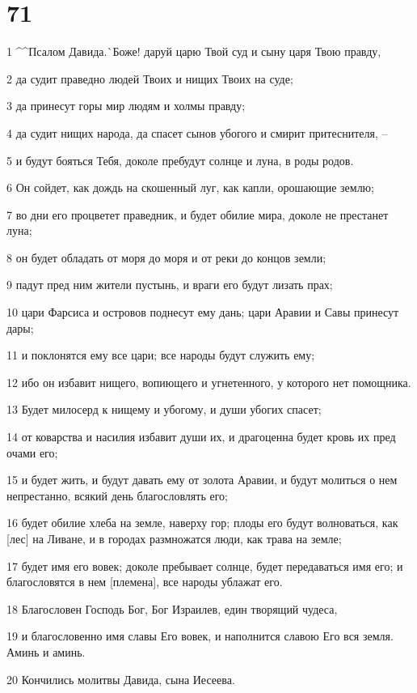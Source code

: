 \chapter{71}

\par 1 ^^Псалом Давида.^^ Боже! даруй царю Твой суд и сыну царя Твою правду,
\par 2 да судит праведно людей Твоих и нищих Твоих на суде;
\par 3 да принесут горы мир людям и холмы правду;
\par 4 да судит нищих народа, да спасет сынов убогого и смирит притеснителя, --
\par 5 и будут бояться Тебя, доколе пребудут солнце и луна, в роды родов.
\par 6 Он сойдет, как дождь на скошенный луг, как капли, орошающие землю;
\par 7 во дни его процветет праведник, и будет обилие мира, доколе не престанет луна;
\par 8 он будет обладать от моря до моря и от реки до концов земли;
\par 9 падут пред ним жители пустынь, и враги его будут лизать прах;
\par 10 цари Фарсиса и островов поднесут ему дань; цари Аравии и Савы принесут дары;
\par 11 и поклонятся ему все цари; все народы будут служить ему;
\par 12 ибо он избавит нищего, вопиющего и угнетенного, у которого нет помощника.
\par 13 Будет милосерд к нищему и убогому, и души убогих спасет;
\par 14 от коварства и насилия избавит души их, и драгоценна будет кровь их пред очами его;
\par 15 и будет жить, и будут давать ему от золота Аравии, и будут молиться о нем непрестанно, всякий день благословлять его;
\par 16 будет обилие хлеба на земле, наверху гор; плоды его будут волноваться, как [лес] на Ливане, и в городах размножатся люди, как трава на земле;
\par 17 будет имя его вовек; доколе пребывает солнце, будет передаваться имя его; и благословятся в нем [племена], все народы ублажат его.
\par 18 Благословен Господь Бог, Бог Израилев, един творящий чудеса,
\par 19 и благословенно имя славы Его вовек, и наполнится славою Его вся земля. Аминь и аминь.
\par 20 Кончились молитвы Давида, сына Иесеева.

